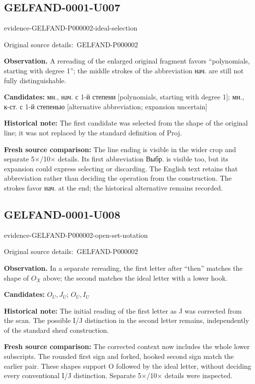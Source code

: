 \documentclass[11pt]{article}
\newcommand{\EvidenceBlock}[4]{%
 \par\smallskip\noindent\begin{minipage}{\linewidth}
 \begin{minipage}[t]{.47\linewidth}\vspace{0pt}\centering
 \csname evidence-#1-#2\endcsname\par
 {\scriptsize\SourceCropCaption\ #1}\par
 \end{minipage}\hfill
 \begin{minipage}[t]{.49\linewidth}\vspace{0pt}\raggedright
 {\small\color{orange!65!black}\textbf{#4} #3}\par
 \end{minipage}
 \end{minipage}\par\smallskip}
\newcommand{\SourceCropCaption}{Original source details:}\newcommand{\ReadingCaption}{Uncertain reading.}\newcommand{\IncompleteCaption}{Undeciphered passage.}\newcommand{\DiagramCaption}{Diagram and typed description.}
\begin{document}
\subsection*{GELFAND-0001-U007}
\EvidenceBlock{GELFAND-P000002}{ideal-selection}{A rereading of the enlarged original fragment favors “polynomials, starting with degree 1”; the middle strokes of the abbreviation нач. are still not fully distinguishable.}{Observation.}
\par\smallskip\noindent\textbf{Candidates: } мн., нач. с 1-й степени [polynomials, starting with degree 1]; мн., к-ст. с 1-й степенью [alternative abbreviation; expansion uncertain]\par
\par\smallskip\noindent\textbf{Historical note: } The first candidate was selected from the shape of the original line; it was not replaced by the standard definition of Proj.\par
\par\smallskip\noindent\textbf{Fresh source comparison: } The line ending is visible in the wider crop and separate 5×/10× details. Its first abbreviation Выбр. is visible too, but its expansion could express selecting or discarding. The English text retains that abbreviation rather than deciding the operation from the construction. The strokes favor нач. at the end; the historical alternative remains recorded.\par

\subsection*{GELFAND-0001-U008}
\EvidenceBlock{GELFAND-P000002}{open-set-notation}{In a separate rereading, the first letter after “then” matches the shape of \(O_X\) above; the second matches the ideal letter with a lower hook.}{Observation.}
\par\smallskip\noindent\textbf{Candidates: } \(O_U,J_U\); \(O_U,I_U\)\par
\par\smallskip\noindent\textbf{Historical note: } The initial reading of the first letter as J was corrected from the scan. The possible I/J distinction in the second letter remains, independently of the standard sheaf construction.\par
\par\smallskip\noindent\textbf{Fresh source comparison: } The corrected context now includes the whole lower subscripts. The rounded first sign and forked, hooked second sign match the earlier pair. These shapes support O followed by the ideal letter, without deciding every conventional I/J distinction. Separate 5×/10× details were inspected.\par
\end{document}
